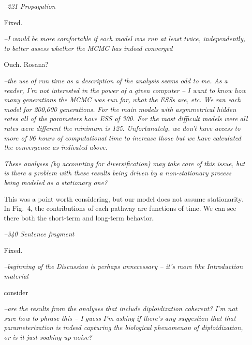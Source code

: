 \documentclass[11pt]{article}
\renewenvironment{quote}{\bigskip\noindent\itshape\ignorespaces}{\smallskip}
\begin{document}
\begin{quote}
--221  Propagation
\end{quote}

Fixed.

\begin{quote}
--I would be more comfortable if each model was run at least twice, independently, to better assess whether the MCMC has indeed converged
\end{quote}

Ouch.  Rosana? %

\begin{quote}
--the use of run time as a description of the analysis seems odd to me.
As a reader, I'm not interested in the power of a given computer -- I want to know how many generations the MCMC was run for, what the ESSs are, etc.
\end{quote}
We ran each model for 200,000 generations. For the main models with asymmetrical hidden rates all of the parameters have ESS of 300. For the most difficult models were all rates were different  the minimum is 125. Unfortunately, we don't have access to more of 96 hours of computational time to increase those but we have calculated the convergence as indicated above.

\begin{quote}
-325  These analyses (by accounting for diversification) may take care of this issue, but is there a problem with these results being driven by a non-stationary process being modeled as a stationary one?
\end{quote}

This was a point worth considering, but our model does not assume stationarity.
In Fig.~4, the contributions of each pathway are functions of time.
We can see there both the short-term and long-term behavior.

\begin{quote}
--340  Sentence fragment
\end{quote}

Fixed. %

\begin{quote}
--beginning of the Discussion is perhaps unnecessary -- it's more like Introduction material
\end{quote}

consider %

\begin{quote}
--are the results from the analyses that include diploidization coherent?
I'm not sure how to phrase this -- I guess I'm asking if there's any suggestion that that parameterization is indeed capturing the biological phenomenon of diploidization, or is it just soaking up noise?
\end{quote}
\end{document}
